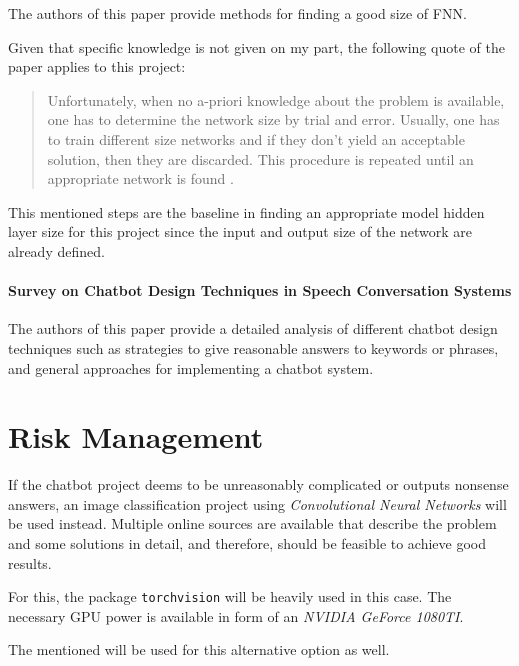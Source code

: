             The authors of this paper provide methods for finding a good size of FNN.

            Given that specific knowledge is not given on my part, the following quote of the paper applies to this project:

            \begin{quote}
                Unfortunately, when no a-priori knowledge about the problem is available, one has to determine the network size by trial and error.
                Usually, one has to train different size networks and if they don't yield an acceptable solution, then they are discarded. 
                This procedure is repeated until an appropriate network is found \cite[Why are small and simple networks better?]{feedforwardsize}.
            \end{quote}
            This mentioned steps are the baseline in finding an appropriate model hidden layer size for this project since the input and output size of the network are already defined.


        \paragraph{Survey on Chatbot Design Techniques in Speech Conversation Systems \cite{abdul2015survey}}
        \label{par:chatbot-survey}

            The authors of this paper provide a detailed analysis of different chatbot design techniques such as strategies to give reasonable answers to keywords or phrases, and general approaches for implementing a chatbot system.
 
        

\section{Risk Management}
\label{sec:risk-management}

    If the chatbot project deems to be unreasonably complicated or outputs nonsense answers, an image classification project using \emph{Convolutional Neural Networks} will be used instead. 
    Multiple online sources \cite{rosebrockPytorchFirstCNN} \cite{rosebrockPytorchWithPretrainedModel} \cite{pytorchCNNTrainingAClassifier} are available that describe the problem and some solutions in detail, and therefore, should be feasible to achieve good results.
    
    For this, the package \texttt{torchvision} will be heavily used in this case.
    The necessary GPU power is available in form of an \emph{NVIDIA GeForce 1080TI}.

    The mentioned  will be used for this alternative option as well.
    

\pagebreak





